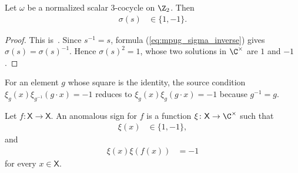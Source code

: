 \begin{lemma}
    \label{thm:mpug_z2_sigma_sign}
    \leanok
    Let $\omega$ be a normalized scalar $3$-cocycle on $\Z_2$. Then
    \begin{align}
        \sigma(s) & \in\{1,-1\}.
        \label{eq:mpug_z2_sigma_sign}
    \end{align}
\end{lemma}

\begin{proof}\leanok
    This is~\cite[``Sign dichotomy for the $\Z_2$ inversion
        scalar'']{QICLean2026Blueprint}.
    Since $s^{-1}=s$, formula (\ref{eq:mpug_sigma_inverse}) gives
    $\sigma(s)=\sigma(s)^{-1}$. Hence $\sigma(s)^2=1$, whose two solutions in
    $\C^\times$ are $1$ and $-1$.
\end{proof}

For an element $g$ whose square is the identity, the source condition
$\xi_g(x)\xi_{g^{-1}}(g\mathbin{\cdot}x)=-1$ reduces to
$\xi_g(x)\xi_g(g\mathbin{\cdot}x)=-1$ because $g^{-1}=g$.

\begin{definition}
    \label{def:mpug_anomalous_involution_sign}
    \leanok
    Let $f\colon\mathsf X\to\mathsf X$. An anomalous sign for $f$ is a
    function $\xi\colon\mathsf X\to\C^\times$ such that
    \begin{align}
        \xi(x) & \in\{1,-1\},
        \label{eq:mpug_anomalous_sign_range}
    \end{align}
    and
    \begin{align}
        \xi(x)\xi(f(x)) & =-1
        \label{eq:mpug_anomalous_sign_pairing}
    \end{align}
    for every $x\in\mathsf X$.
\end{definition}

